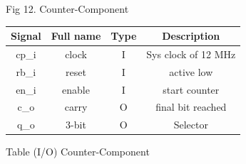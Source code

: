 \documentclass{article}
\begin{document}
Fig 12. Counter-Component

\vspace{2.5cm}
\begin{center}
           \begin{tabular}{|c|c|c|c|}
        \hline 
        Signal  &  Full name & Type & Description \\
        \hline
        \hline
        cp\_i & clock & I &Sys clock of 12 MHz \\
        \hline
        rb\_i & reset &  I & active low \\
        \hline
        en\_i & enable & I & start counter  \\
        \hline
        c\_o & carry  & O &final bit reached \\
        \hline
        q\_o &   3-bit  & O & Selector\\
        \hline 
          \end{tabular}
\end{center}

Table (I/O) Counter-Component
\end{document}
